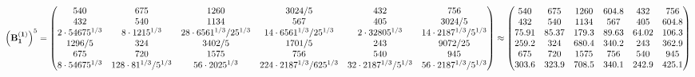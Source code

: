 \documentclass[10pt,a4paper]{article}
\begin{document}
	\[
		\left(\bold{B_1^{(1)}}\right)^{5} = 
		\begin{pmatrix}
			{{540}}{} & {{675}}{} & {{1260}}{} & {{3024}} / {{5}} & {{432}}{} & {{756}}{} \\
			{{432}}{} & {{540}}{} & {{1134}}{} & {{567}}{} & {{405}}{} & {{3024}} / {{5}} \\
			{{2} \cdot {54675^ {1 / 3}}}{} & {{8} \cdot {1215^ {1 / 3}}}{} & {{28} \cdot {6561^ {1 / 3}}} / {{25^ {1 / 3}}} & {{14} \cdot {6561^ {1 / 3}}} / {{25^ {1 / 3}}} & {{2} \cdot {32805^ {1 / 3}}}{} & {{14} \cdot {2187^ {1 / 3}}} / {{5^ {1 / 3}}} \\
			{{1296}} / {{5}} & {{324}}{} & {{3402}} / {{5}} & {{1701}} / {{5}} & {{243}}{} & {{9072}} / {{25}} \\
			{{675}}{} & {{720}}{} & {{1575}}{} & {{756}}{} & {{540}}{} & {{945}}{} \\
			{{8} \cdot {54675^ {1 / 3}}}{} & {{128} \cdot {81^ {1 / 3}}} / {{5^ {1 / 3}}} & {{56} \cdot {2025^ {1 / 3}}}{} & {{224} \cdot {2187^ {1 / 3}}} / {{625^ {1 / 3}}} & {{32} \cdot {2187^ {1 / 3}}} / {{5^ {1 / 3}}} & {{56} \cdot {2187^ {1 / 3}}} / {{5^ {1 / 3}}} \\
		\end{pmatrix}
		\approx
		\begin{pmatrix}
			540      & 675      & 1260     & 604.8    & 432      & 756      \\
			432      & 540      & 1134     & 567      & 405      & 604.8    \\
			75.91    & 85.37    & 179.3    & 89.63    & 64.02    & 106.3    \\
			259.2    & 324      & 680.4    & 340.2    & 243      & 362.9    \\
			675      & 720      & 1575     & 756      & 540      & 945      \\
			303.6    & 323.9    & 708.5    & 340.1    & 242.9    & 425.1    \\
		\end{pmatrix}
	\]
\end{document}
